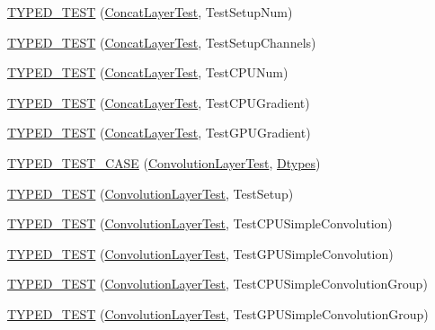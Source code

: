 \begin{DoxyCompactItemize}
\item 
\hyperlink{namespacecaffe_a6f7ad9d3dbcf38f7d4818073d629f12d}{T\+Y\+P\+E\+D\+\_\+\+T\+E\+S\+T} (\hyperlink{classcaffe_1_1_concat_layer_test}{Concat\+Layer\+Test}, Test\+Setup\+Num)
\item 
\hyperlink{namespacecaffe_a66119a58aff8610c6e8da30335405cbe}{T\+Y\+P\+E\+D\+\_\+\+T\+E\+S\+T} (\hyperlink{classcaffe_1_1_concat_layer_test}{Concat\+Layer\+Test}, Test\+Setup\+Channels)
\item 
\hyperlink{namespacecaffe_a1b4b2b7d5486ceae9c6bba9fabfa8a3c}{T\+Y\+P\+E\+D\+\_\+\+T\+E\+S\+T} (\hyperlink{classcaffe_1_1_concat_layer_test}{Concat\+Layer\+Test}, Test\+C\+P\+U\+Num)
\item 
\hyperlink{namespacecaffe_aba43c36c616f632c7bb190792e3ac946}{T\+Y\+P\+E\+D\+\_\+\+T\+E\+S\+T} (\hyperlink{classcaffe_1_1_concat_layer_test}{Concat\+Layer\+Test}, Test\+C\+P\+U\+Gradient)
\item 
\hyperlink{namespacecaffe_a065900f753600d753583ae5b7f0a69d3}{T\+Y\+P\+E\+D\+\_\+\+T\+E\+S\+T} (\hyperlink{classcaffe_1_1_concat_layer_test}{Concat\+Layer\+Test}, Test\+G\+P\+U\+Gradient)
\item 
\hyperlink{namespacecaffe_ad73666a0efa407f3f0f210797b495556}{T\+Y\+P\+E\+D\+\_\+\+T\+E\+S\+T\+\_\+\+C\+A\+S\+E} (\hyperlink{classcaffe_1_1_convolution_layer_test}{Convolution\+Layer\+Test}, \hyperlink{namespacecaffe_a131dc2be50f2f10e18450da61cde6b57}{Dtypes})
\item 
\hyperlink{namespacecaffe_a2a80f05c92271c56eae27a0e9d63ddfc}{T\+Y\+P\+E\+D\+\_\+\+T\+E\+S\+T} (\hyperlink{classcaffe_1_1_convolution_layer_test}{Convolution\+Layer\+Test}, Test\+Setup)
\item 
\hyperlink{namespacecaffe_a37b9c6306efac6c10876d37fcb2ee1f7}{T\+Y\+P\+E\+D\+\_\+\+T\+E\+S\+T} (\hyperlink{classcaffe_1_1_convolution_layer_test}{Convolution\+Layer\+Test}, Test\+C\+P\+U\+Simple\+Convolution)
\item 
\hyperlink{namespacecaffe_add977ca8a5cb06d023bc63b0610d116c}{T\+Y\+P\+E\+D\+\_\+\+T\+E\+S\+T} (\hyperlink{classcaffe_1_1_convolution_layer_test}{Convolution\+Layer\+Test}, Test\+G\+P\+U\+Simple\+Convolution)
\item 
\hyperlink{namespacecaffe_af8f0d651ea0dcd7819340a19850dcf98}{T\+Y\+P\+E\+D\+\_\+\+T\+E\+S\+T} (\hyperlink{classcaffe_1_1_convolution_layer_test}{Convolution\+Layer\+Test}, Test\+C\+P\+U\+Simple\+Convolution\+Group)
\item 
\hyperlink{namespacecaffe_ae6dd5ae544b509a41733b2be0b5fa183}{T\+Y\+P\+E\+D\+\_\+\+T\+E\+S\+T} (\hyperlink{classcaffe_1_1_convolution_layer_test}{Convolution\+Layer\+Test}, Test\+G\+P\+U\+Simple\+Convolution\+Group)

\end{DoxyCompactItemize}
